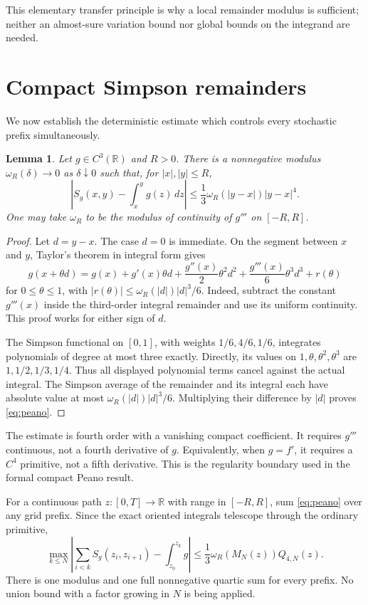 \documentclass[11pt]{article}
\newtheorem{lemma}[theorem]{Lemma}
\theoremstyle{remark}\newtheorem{remark}[theorem]{Remark}
\newcommand{\R}{\mathbb R}\newcommand{\Pconv}{\xrightarrow{\mathrm P}}
\begin{document}
This elementary transfer principle is why a local remainder
modulus is sufficient; neither an almost-sure variation bound
nor global bounds on the integrand are needed.

\section{Compact Simpson remainders}
We now establish the deterministic estimate which controls
every stochastic prefix simultaneously.

\begin{lemma}\label{lem:peano}
Let $g\in C^3(\R)$ and $R>0$. There is a nonnegative modulus
$\omega_R(\delta)\to0$ as $\delta\downarrow0$ such that, for
$|x|,|y|\leq R$,
\begin{equation}\label{eq:peano}
 \left|S_g(x,y)-\int_x^y g(z)\,dz\right|
 \leq\frac13\omega_R(|y-x|)|y-x|^4.
\end{equation}
One may take $\omega_R$ to be the modulus of continuity of
$g'''$ on $[-R,R]$.
\end{lemma}
\begin{proof}
Let $d=y-x$. The case $d=0$ is immediate. On the segment between
$x$ and $y$, Taylor's theorem in integral form gives
\[
 g(x+\theta d)=g(x)+g'(x)\theta d
 +\frac{g''(x)}2\theta^2d^2+\frac{g'''(x)}6\theta^3d^3+r(\theta)
\]
for $0\leq\theta\leq1$, with
$|r(\theta)|\leq\omega_R(|d|)|d|^3/6$.
Indeed, subtract the constant $g'''(x)$ inside the third-order
integral remainder and use its uniform continuity. This proof
works for either sign of $d$.

The Simpson functional on $[0,1]$, with weights $1/6,4/6,1/6$,
integrates polynomials of degree at most three exactly. Directly,
its values on $1,\theta,\theta^2,\theta^3$ are
$1,1/2,1/3,1/4$. Thus all displayed polynomial terms cancel
against the actual integral. The Simpson average of the remainder
and its integral each have absolute value at most
$\omega_R(|d|)|d|^3/6$. Multiplying their difference by $|d|$
proves \eqref{eq:peano}.
\end{proof}

The estimate is fourth order with a vanishing compact coefficient.
It requires $g'''$ continuous, not a fourth derivative of $g$.
Equivalently, when $g=f'$, it requires a $C^4$ primitive, not a
fifth derivative. This is the regularity boundary used in the
formal compact Peano result.

For a continuous path $z:[0,T]\to\R$ with range in $[-R,R]$,
sum \eqref{eq:peano} over any grid prefix. Since the exact
oriented integrals telescope through the ordinary primitive,
\begin{equation}\label{eq:pathbound}
 \max_{k\leq N}\left|
 \sum_{i<k}S_g(z_i,z_{i+1})-\int_{z_0}^{z_k}g\right|
 \leq\frac13\omega_R(M_N(z))Q_{4,N}(z).
\end{equation}
There is one modulus and one full nonnegative quartic sum for
every prefix. No union bound with a factor growing in $N$ is
being applied.
\end{document}
